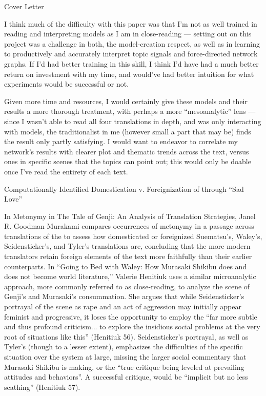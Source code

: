 \documentclass[12pt]{article}
\newenvironment{coverletter}{\begin{center} Cover Letter \end{center}}{\newpage }
\begin{document}
\begin{flushleft}
\begin{spacing}{2.0}
\begin{coverletter}
I think much of the difficulty with this paper was that I'm not as well trained in reading and interpreting models as I am in close-reading --- setting out on this project was a challenge in both, the model-creation respect, as well as in learning to productively and accurately interpret topic signals and force-directed network graphs.  If I'd had better training in this skill, I think I'd have had a much better return on investment with my time, and would've had better intuition for what experiments would be successful or not. \linebreak

Given more time and resources, I would certainly give these models and their results a more thorough treatment, with perhaps a more ``mesoanalytic'' lens --- since I wasn't able to read all four translations in depth, and was only interacting with models, the traditionalist in me (however small a part that may be) finds the result only partly satisfying. I would want to endeavor to correlate my network's results with clearer plot and thematic trends across the text, versus ones in specific scenes that the topics can point out; this would only be doable once I've read the entirety of each text.

\end{coverletter}


\begin{center}
Computationally Identified Domestication v. Foreignization of  through ``Sad Love''
\end{center}

\setlength{\parindent}{0.5in}

In Metonymy in The Tale of Genji: An Analysis of Translation Strategies, Janel R. Goodman Murakami compares occurrences of metonymy in a passage across translations of the  to assess how domesticated or foreignized Suematsu's, Waley's, Seidensticker's, and Tyler's translations are, concluding that the more modern translators retain foreign elements of the text more faithfully than their earlier counterparts. In ``Going to Bed with Waley: How Murasaki Shikibu does and does not become world literature,'' Valerie Henitiuk uses a similar microanalytic approach, more commonly referred to as close-reading, to analyze the scene of Genji's and Murasaki's consummation. She argues that while Seidensticker's  portrayal of the scene as rape and an act of aggression may initially appear feminist and progressive, it loses the opportunity to employ the ``far more subtle and thus profound criticism... to explore the insidious social problems at the very root of situations like this'' (Henitiuk 56). Seidensticker's portrayal, as well as Tyler's (though to a lesser extent), emphasizes the difficulties of the specific situation over the system at large, missing the larger social commentary that Murasaki Shikibu is making, or the ``true critique being leveled at prevailing attitudes and behaviors''. A successful critique, would be ``implicit but no less scathing'' (Henitiuk 57).


\end{spacing}
\end{flushleft}
\end{document}
